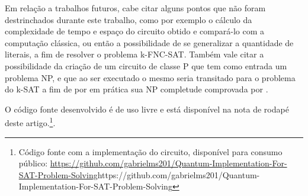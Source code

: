 \documentclass[12pt]{article}
\begin{document}
Em relação a trabalhos futuros, cabe citar alguns pontos que não foram destrinchados durante este trabalho, como por exemplo o cálculo da complexidade de tempo e espaço do circuito obtido e compará-lo com a computação clássica, ou então a possibilidade de se generalizar a quantidade de literais, a fim de resolver o problema k-FNC-SAT.
Também vale citar a possibilidade da criação de um circuito de classe P que tem como entrada um problema NP, e que ao ser executado o mesmo seria transitado para o problema do k-SAT a fim de por em prática sua NP completude comprovada por \cite{cook:71}. 

O código fonte desenvolvido é de uso livre e está disponível na nota de rodapé deste artigo.\footnote{Código fonte com a implementação do circuito, disponível para consumo público:
\url{https://github.com/gabrielms201/Quantum-Implementation-For-SAT-Problem-Solving}{https://github.com/gabrielms201/Quantum-Implementation-For-SAT-Problem-Solving}}.



\end{document}

